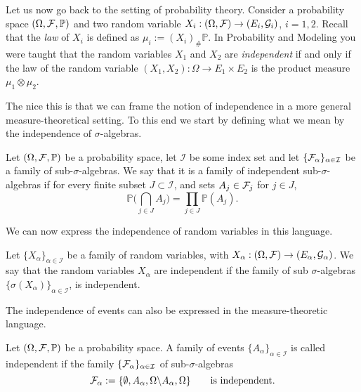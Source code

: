 \medskip

Let us now go back to the setting of probability theory. Consider a probability space $(\Omega, \mathcal F, \mathbb{P})$ and two random variable $X_i: (\Omega, \mathcal F) \to (E_i, \mathcal{G}_i)$, $i=1,2$. Recall that the \emph{law} of $X_i$ is defined as $\mu_i:= (X_i)_\# \mathbb{P}$. In Probability and Modeling you were taught that the random variables $X_1$ and $X_2$ are \emph{independent} if and only if the law of the random variable $(X_1, X_2): \Omega \to E_1\times E_2$ is the product measure $\mu_1 \otimes \mu_2$.

The nice this is that we can frame the notion of independence in a more general measure-theoretical setting. To this end we start by defining what we mean by the independence of $\sigma$-algebras.

\begin{definition}
	Let $(\Omega, \mathcal F, \mathbb{P})$ be a probability space, let $\mathcal{I}$ be some index set and let $\{\mathcal F_\alpha\}_{\alpha \in \mathcal{I}}$ be a family of sub-$\sigma$-algebras. We say that it is a family of independent sub-$\sigma$-algebras if for every finite subset $J \subset \mathcal{I}$, and sets $A_j\in \mathcal F_j$ for $j \in J$,
	\[
	\mathbb{P}\biggl( \bigcap_{j \in J} A_j \biggr) = \prod_{j \in J} \mathbb{P}(A_{j}).
	\]
\end{definition}

We can now express the independence of random variables in this language.

\begin{definition}
	Let $\{X_\alpha\}_{\alpha \in \mathcal{I}}$ be a family of random variables, with $X_\alpha:(\Omega, \mathcal F) \to (E_\alpha, \mathcal{G}_\alpha)$. We say that the random variables $X_\alpha$ are independent if the family of sub $\sigma$-algebras $\{\sigma(X_\alpha)\}_{\alpha \in \mathcal{I}}$, is independent.
\end{definition}

The independence of events can also be expressed in the measure-theoretic language.

\begin{definition}
	Let $(\Omega, \mathcal F, \mathbb{P})$ be a probability space. A family of events $\{A_\alpha\}_{\alpha \in \mathcal{I}}$ is called independent if the family $\{ \mathcal F_\alpha \}_{\alpha\in\mathcal{I}}$ of sub-$\sigma$-algebras
	\[
	\mathcal F_\alpha := \{ \emptyset, A_\alpha, \Omega \backslash A_\alpha, \Omega \}\qquad\text{is independent.}
	\]	
\end{definition}


